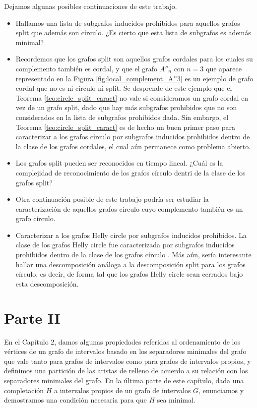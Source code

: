 \documentclass[12pt]{book}
\theoremstyle{plain}
\theoremstyle{remark}
\begin{document}
Dejamos algunas posibles continuaciones de este trabajo.

\begin{itemize}
\item Hallamos una lista de subgrafos inducidos prohibidos para aquellos grafos split que además son círculo. ¿Es cierto que esta lista de subgrafos es además minimal?

\item Recordemos que los grafos split son aquellos grafos cordales para los cuales su complemento también es cordal, y que el grafo $A''_n$ con $n = 3$ que aparece re\-pre\-sen\-ta\-do en la Figura \ref{fig:local_complement_A''3} es un ejemplo de grafo cordal que no es ni círculo ni split. Se desprende de este ejemplo que el Teorema \ref{teo:circle_split_caract} no vale si consideramos un grafo cordal en vez de un grafo split, dado que hay más subgrafos prohibidos que no son considerados en la lista de subgrafos prohibidos dada. Sin embargo, el Teorema \ref{teo:circle_split_caract} es de hecho un buen primer paso para caracterizar a los grafos círculo por subgrafos inducidos prohibidos dentro de la clase de los grafos cordales, el cual aún permanece como problema abierto. 

\item Los grafos split pueden ser reconocidos en tiempo lineal. ¿Cuál es la complejidad de reconocimiento de los grafos círculo dentri de la clase de los grafos split?

\item Otra continuación posible de este trabajo podría ser estudiar la caracterización de aquellos grafos círculo cuyo complemento también es un grafo círculo. 

\item Caracterizar a los grafos Helly circle por subgrafos inducidos prohibidos. La clase de los grafos Helly circle fue caracterizada por subgrafos inducidos prohibidos dentro de la clase de los grafos círculo \cite{DGR10}.
Más aún, sería interesante hallar una descomposición análoga a la descomposición split para los grafos círculo, es decir, de forma tal que los grafos Helly circle sean cerrados bajo esta descomposición.
\end{itemize}


\section*{Parte II}

En el Capítulo 2, damos algunas propiedades referidas al ordenamiento de los vértices de un grafo de intervalos basado en los separadores minimales del grafo que vale tanto para grafos de intervalos como para grafos de intervalos propios, y definimos una par\-ti\-ción de las aristas de relleno de acuerdo a su relación con los separadores minimales del grafo. En la última parte de este capítulo, dada una completación $H$ a intervalos propios de un grafo de intervalos $G$, enunciamos y demostramos una condición necesaria para que $H$ sea minimal.
\end{document}
